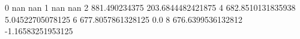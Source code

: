 0 nan nan
1 nan nan
2 881.490234375 203.6844482421875
4 682.8510131835938 5.04522705078125
6 677.8057861328125 0.0
8 676.6399536132812 -1.16583251953125
